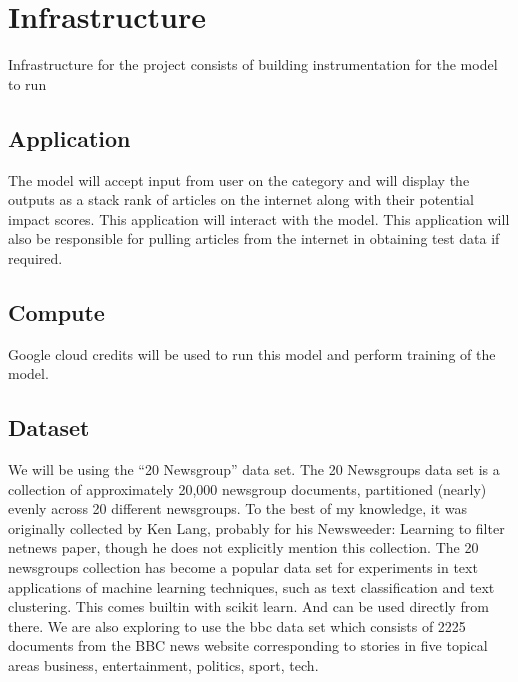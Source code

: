 \documentclass{article}
\begin{document}
\section*{Infrastructure} %
Infrastructure for the project consists of building instrumentation for the model to run

\subsection*{Application}
The model will accept input from user on the category and will display the outputs as a stack rank of articles on the internet along with their potential impact scores. This application will interact with the model. This application will also be responsible for pulling articles from the internet in obtaining test data if required.

\subsection*{Compute}
Google cloud credits will be used to run this model and perform training of the model. 

\subsection*{Dataset}
We will be using the “20 Newsgroup” data set. The 20 Newsgroups data set is a collection of approximately 20,000 newsgroup documents, partitioned (nearly) evenly across 20 different newsgroups. To the best of my knowledge, it was originally collected by Ken Lang, probably for his Newsweeder: Learning to filter netnews paper, though he does not explicitly mention this collection. The 20 newsgroups collection has become a popular data set for experiments in text applications of machine learning techniques, such as text classification and text clustering. This comes builtin with scikit learn. And can be used directly from there. \newline
We are also exploring to use the bbc data set which consists of 2225 documents from the BBC news website corresponding to stories in five topical areas business, entertainment, politics, sport, tech. 

\maketitle %

\end{document}
